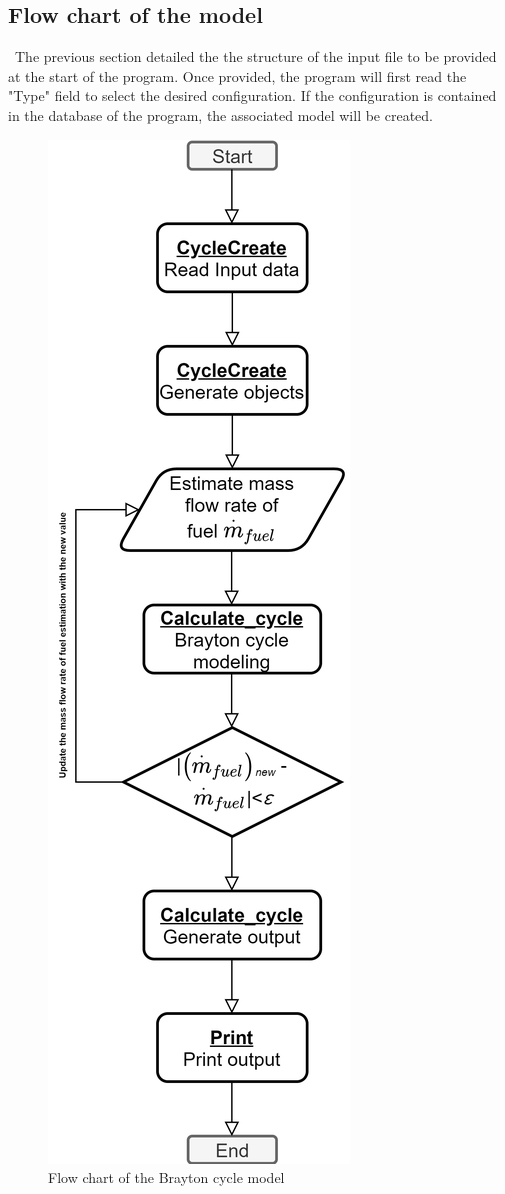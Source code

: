 \subsection{Flow chart of the model}
\quad\,  The previous section detailed the the structure of the input file to be provided at the start of the program. Once provided, the program will first read the "Type" field to select the desired configuration. If the configuration is contained in the database of the program, the associated model will be created.
\begin{figure}
\centering
\includegraphics{Flow_chart.png}
\caption{Flow chart of the Brayton cycle model}
\label{fig:C5_flowchart}
\end{figure}
